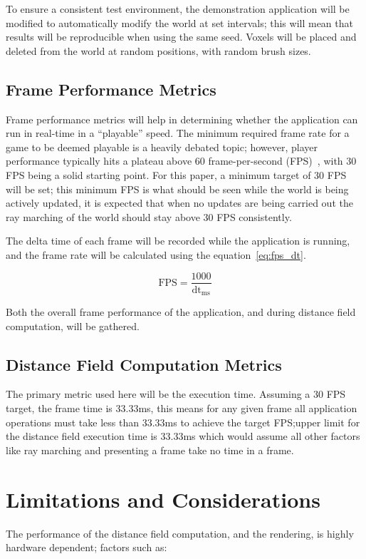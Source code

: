 To ensure a consistent test environment, the demonstration application will be modified to automatically modify the
world at set intervals; this will mean that results will be reproducible when using the same seed. Voxels will be placed
and deleted from the world at random positions, with random brush sizes.

\subsection{Frame Performance Metrics}\label{sec:frame_perf_metrics}
Frame performance metrics will help in determining whether the application can run in real-time in a ``playable'' speed.
The minimum required frame rate for a game to be deemed playable is a heavily debated topic; however, player performance
typically hits a plateau above 60 frame-per-second (FPS)~\cite{claypool2007frame}, with 30 FPS being a solid starting
point. For this paper, a minimum target of 30 FPS will be set; this minimum FPS is what should be seen while the world
is being actively updated, it is expected that when no updates are being carried out the ray marching of the world should
stay above 30 FPS consistently.

The delta time of each frame will be recorded while the application is running, and the frame rate will be calculated
using the equation~\ref{eq:fps_dt}.

\begin{equation}\label{eq:fps_dt}
    \text{FPS} = \frac{1000}{\text{dt}_{\text{ms}}}
\end{equation}

Both the overall frame performance of the application, and during distance field computation, will be gathered.

\subsection{Distance Field Computation Metrics}\label{sec:distance_field_metrics}
The primary metric used here will be the execution time. Assuming a 30 FPS target, the frame time is 33.33ms, this means
for any given frame all application operations must take less than 33.33ms to achieve the target FPS;\@the upper
limit for the distance field execution time is 33.33ms which would assume all other factors like ray marching and
presenting a frame take no time in a frame.

\section{Limitations and Considerations}
The performance of the distance field computation, and the rendering, is highly hardware dependent; factors such as:

